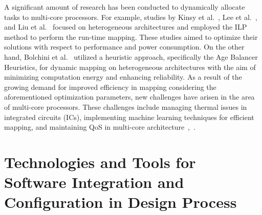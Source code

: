 A significant amount of research has been conducted to dynamically allocate tasks to multi-core processors. For example, studies by Kinsy et al.~\cite{kinsy2014algorithms}, Lee et al.~\cite{lee2014workload}, and Liu et al.~\cite{liu2013dynamic} focused on heterogeneous architectures and employed the ILP method to perform the run-time mapping. These studies aimed to optimize their solutions with respect to performance and power consumption. On the other hand, Bolchini et al.~\cite{bolchini2016combined} utilized a heuristic approach, specifically the Age Balancer Heuristics, for dynamic mapping on heterogeneous architectures with the aim of minimizing computation energy and enhancing reliability.
As a result of the growing demand for improved efficiency in mapping considering the aforementioned optimization parameters, new challenges have arisen in the area of multi-core processors. These challenges include managing thermal issues in integrated circuits (ICs), implementing machine learning techniques for efficient mapping, and maintaining QoS in multi-core architecture~\cite{gupta2021mapping},~\cite{singh2013mapping}.




\section{Technologies and Tools for Software Integration and Configuration in Design Process}\label{tools_relatedwork}


